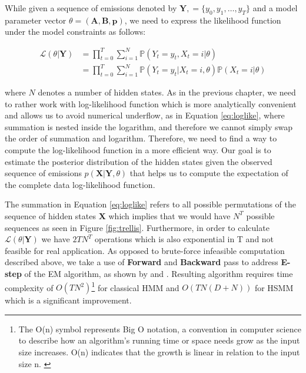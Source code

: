While given a sequence of emissions denoted by $\textbf{Y}, = \{y_0,y_1,\ldots,y_T\}$ and a model parameter vector $\theta = (\textbf{A},\textbf{B},\textbf{p})$, 
we need to express the likelihood function under the model constraints as follows:

\begin{align} \label{eq:loglikeFB}
    \mathcal{L}( \theta| \textbf{Y}) & = \prod\limits_{t=0}^T \sum\limits_{i=1}^N  \mathbb{P}(Y_t = y_t, X_t = i| \theta) \\
                                     & = \prod\limits_{t=0}^T \sum\limits_{i=1}^N  \mathbb{P}(Y_t = y_t | X_t = i, \theta) \mathbb{P}(X_t=i|\theta)
\end{align}

where $N$ denotes a number of hidden states. As in the previous chapter, we need to rather work with log-likelihood function which is more analytically convenient 
and allows us to avoid numerical underflow, as in Equation \ref{eq:loglike}, where summation is nested inside the logarithm, and therefore we cannot simply swap the order of summation and logarithm. Therefore, we need to find a way to compute the log-likelihood function 
in a more efficient way. Our goal is to estimate the posterior distribution of the hidden states given the observed sequence of emissions $p(\textbf{X}|\textbf{Y},\theta)$
that helps us to compute the expectation of the complete data log-likelihood function.

The summation in Equation \ref{eq:loglike} refers to all possible permutations of the sequence of hidden states \textbf{X} 
which implies that we would have $N^T$ possible sequences as seen in Figure \ref{fig:trellis}. Furthermore, in order to calculate $\mathcal{L}( \theta| \textbf{Y})$ we have $2TN^T$ 
operations which is also exponential in T and not feasible for real application. As opposed to brute-force infeasible
computation described above, we take a use of \textbf{Forward} and \textbf{Backward} pass to address \textbf{E-step} of the EM algorithm, as shown by \citep{Bishop2006} and \citep{Rabiner1989}.
Resulting algorithm requires time complexity of $O(TN^2)$\footnote{The O(n) symbol represents Big O notation, 
a convention in computer science to describe how an algorithm's running time or space needs grow as the input size increases. 
O(n) indicates that the growth is linear in relation to the input size n. \citep{Mohr2014}} 
for classical HMM and $O(TN(D+N))$ for HSMM which is a significant improvement. 

